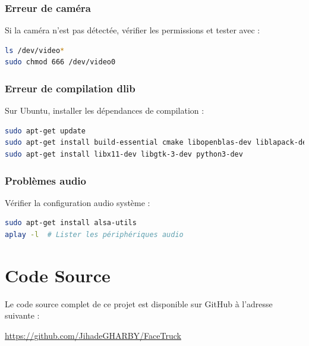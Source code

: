 \documentclass[12pt,a4paper]{article}
\begin{document}
\subsubsection{Erreur de caméra}

Si la caméra n'est pas détectée, vérifier les permissions et tester avec :

\begin{lstlisting}[language=bash]
ls /dev/video*
sudo chmod 666 /dev/video0
\end{lstlisting}

\subsubsection{Erreur de compilation dlib}

Sur Ubuntu, installer les dépendances de compilation :

\begin{lstlisting}[language=bash]
sudo apt-get update
sudo apt-get install build-essential cmake libopenblas-dev liblapack-dev
sudo apt-get install libx11-dev libgtk-3-dev python3-dev
\end{lstlisting}

\subsubsection{Problèmes audio}

Vérifier la configuration audio système :

\begin{lstlisting}[language=bash]
sudo apt-get install alsa-utils
aplay -l  # Lister les périphériques audio
\end{lstlisting}

\renewcommand{\thesection}{\arabic{section}}
\setcounter{section}{10}
\section{Code Source}
Le code source complet de ce projet est disponible sur GitHub à l'adresse suivante :
\begin{center}
\url{https://github.com/JihadeGHARBY/FaceTruck}
\end{center}
\end{document}
